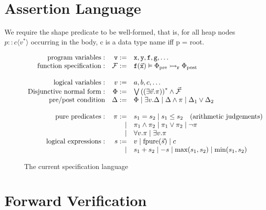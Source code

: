 \section{Assertion Language}

We require the shape predicate to be well-formed, that is, for all heap nodes $p::c\langle v^* \rangle$ occurring in the body, c is a data type name iff p = root.


\begin{figure}[htp]
$$\begin{array}{rrl}
    \text{program variables}: & \texttt{v} :=        
        & \texttt{x},\texttt{y},\texttt{f},\texttt{g},\ldots\\
    \text{function specification}: & \mathcal{F} := 
        & \texttt{f}(\vec{\texttt{x}}) \vDash \Phi_{\text{pre}} \rightarrowtail_{\mathtt{r} } \Phi_{\text{post}} \\
    \\
    \text{logical variables}: & v := 
        & a, b,c, \ldots \\
    \text{Disjunctive normal form}: &\Phi := 
        & \bigvee \left((\exists \vec{v}. \pi)\right)^{*} \wedge \vec{\mathcal{F}} \\
    \text{pre/post condition} & \Delta := 
        & \Phi \mid \exists v. \Delta \mid \Delta \wedge \pi \mid \Delta_1 \vee \Delta_2 \\
    \\
    \text{pure predicates}: & \pi := 
        & s_1 = s_2 \mid s_1 \le s_2 \text{\quad (arithmetic judgements)} \\
    &\mid& \pi_1 \wedge \pi_2 \mid \pi_1 \vee \pi_2 \mid \neg \pi \\
    &\mid& \forall v. \pi \mid \exists v. \pi  \\
    \text{logical expressions}: & s := 
        & v \mid \mathrm{fpure}(\vec{s}) \mid c \\
    &\mid& s_1 + s_2 \mid - s \mid \text{max}(s_1,s_2) \mid  \text{min}(s_1,s_2) 
\end{array}$$
    \caption{The current specification language}
    \label{fig:AssASTcur}
\end{figure}


\section{Forward Verification}


